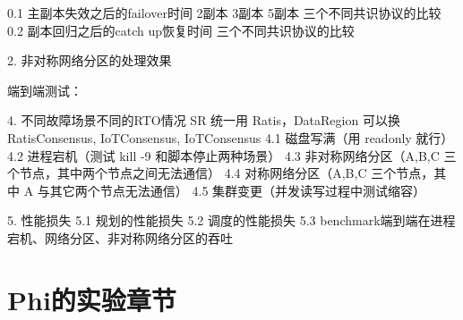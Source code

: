 0.1 主副本失效之后的failover时间
    2副本 3副本 5副本 三个不同共识协议的比较
0.2 副本回归之后的catch up恢复时间
    三个不同共识协议的比较

2.  非对称网络分区的处理效果




端到端测试：

4. 不同故障场景不同的RTO情况
SR 统一用 Ratis，DataRegion 可以换 RatisConsensus, IoTConsensus, IoTConsensus
4.1 磁盘写满（用 readonly 就行）
4.2 进程宕机（测试 kill -9 和脚本停止两种场景）
4.3 非对称网络分区（A,B,C 三个节点，其中两个节点之间无法通信）
4.4 对称网络分区（A,B,C 三个节点，其中 A 与其它两个节点无法通信）
4.5 集群变更（并发读写过程中测试缩容）

5. 性能损失
5.1 规划的性能损失
5.2 调度的性能损失
5.3 benchmark端到端在进程宕机、网络分区、非对称网络分区的吞吐



\section{Phi的实验章节}\label{exp-phi}
